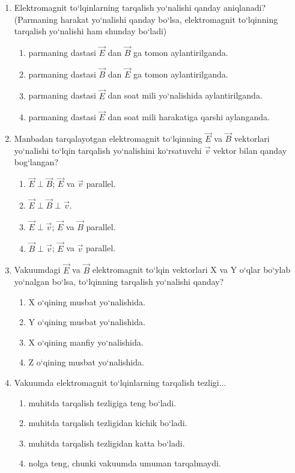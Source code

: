 \begin{enumerate}
\item Elektromagnit to‘lqinlarning tarqalish yo‘nalishi qanday aniqlanadi? (Parmaning harakat yo‘nalishi qanday bo‘lsa, elektromagnit to‘lqinning tarqalish yo‘nalishi ham shunday bo‘ladi)
\begin{enumerate}[label=\Alph*)]
\item parmaning dastasi $\vec{E}$ dan $\vec{B}$ ga tomon aylantirilganda.
\item parmaning dastasi $\vec{B}$ dan $\vec{E}$ ga tomon aylantirilganda.
\item parmaning dastasi $\vec{E}$ dan soat mili yo‘nalishida aylantirilganda.
\item parmaning dastasi $\vec{E}$ dan soat mili harakatiga qarshi aylanganda.
\end{enumerate}

\item Manbadan tarqalayotgan elektromagnit to‘lqinning $\vec{E}$ va $\vec{B}$ vektorlari yo‘nalishi to‘lqin tarqalish yo‘nalishini ko‘rsatuvchi $\vec{v}$ vektor bilan qanday bog‘langan?
\begin{enumerate}[label=\Alph*)]
\item $\vec{E}\perp\vec{B}$; $\vec{E}$ va $\vec{v}$ parallel.
\item $\vec{E}\perp\vec{B}\perp\vec{v}$.
\item $\vec{E}\perp\vec{v}$; $\vec{E}$ va $\vec{B}$ parallel.
\item $\vec{B}\perp\vec{v}$; $\vec{E}$ va $\vec{v}$ parallel.
\end{enumerate}

\item Vakuumdagi $\vec{E}$ va $\vec{B}$ elektromagnit to‘lqin vektorlari X va Y o‘qlar bo‘ylab yo‘nalgan bo‘lsa, to‘lqinning tarqalish yo‘nalishi qanday?
\begin{enumerate}[label=\Alph*)]
\item X o‘qining musbat yo‘nalishida.
\item Y o‘qining musbat yo‘nalishida.
\item X o‘qining manfiy yo‘nalishida.
\item Z o‘qining musbat yo‘nalishida.
\end{enumerate}

\item Vakuumda elektromagnit to‘lqinlarning tarqalish tezligi...
\begin{enumerate}[label=\Alph*)]
\item muhitda tarqalish tezligiga teng bo‘ladi.
\item muhitda tarqalish tezligidan kichik bo‘ladi.
\item muhitda tarqalish tezligidan katta bo‘ladi.
\item nolga teng, chunki vakuumda umuman tarqalmaydi.
\end{enumerate}


\end{enumerate}
